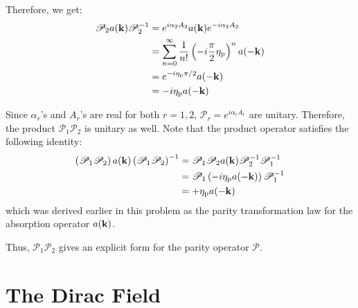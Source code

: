 \documentclass[letterpaper,12pt]{article}
\newenvironment{problem}{\subsection{}\begin{adjustwidth}{0.25in}{}\vspace{-\baselineskip}}{\end{adjustwidth}}
\newenvironment{subproblem}{\subsubsection{}\begin{adjustwidth}{0.4in}{}\vspace{-\baselineskip}}{\end{adjustwidth}}
\begin{document}
\begin{problem}
\begin{subproblem}
	Therefore, we get:
	\begin{align*}
		\mathscr{P}_2 a(\vb{k}) \mathscr{P}_2^{-1}
		&= e^{i\alpha_2A_2} a(\vb{k}) e^{-i\alpha_2A_2}	\\
		&= \sum_{n=0}^{\infty} \frac{1}{n!} \left(-i\frac{\pi}{2}\eta_\text{p}\right)^n a(-\vb{k})	\\
		&= e^{-i\eta_\text{p}\pi/2} a(-\vb{k})	\\
		&= -i \eta_\text{p} a(-\vb{k})
	\end{align*}
\end{subproblem}

Since $\alpha_r$'s and $A_r$'s are real for both $r=1,2$, $\mathscr{P}_r = e^{i\alpha_r A_r}$ are unitary. Therefore, the product $\mathscr{P}_1 \mathscr{P}_2$ is unitary as well. Note that the product operator satisfies the following identity:
\begin{align*}
	\left(\mathscr{P}_1\mathscr{P}_2\right) a(\vb{k}) \left(\mathscr{P}_1\mathscr{P}_2\right)^{-1}
	&= \mathscr{P}_1 \mathscr{P}_2 a(\vb{k}) \mathscr{P}_2^{-1} \mathscr{P}_1^{-1}	\\
	&= \mathscr{P}_1 \left(-i\eta_\text{p}a(-\vb{k})\right) \mathscr{P}_1^{-1}	\\
	&= +\eta_\text{p} a(-\vb{k})		 
\end{align*}
which was derived earlier in this problem as the parity transformation law for the absorption operator $a(\vb{k})$.

Thus, $\mathscr{P}_1\mathscr{P}_2$ gives an explicit form for the parity operator $\mathscr{P}$.
\end{problem}

\pagebreak



\section{The Dirac Field}
\end{document}
